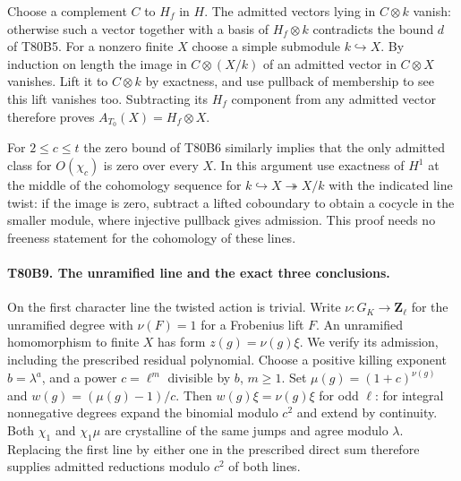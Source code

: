 Choose a complement $C$ to $H_f$ in $H$. The admitted vectors lying in
$C\otimes k$ vanish: otherwise such a vector together with a basis of
$H_f\otimes k$ contradicts the bound $d$ of T80B5. For a nonzero
finite $X$ choose a simple submodule $k\hookrightarrow X$. By induction
on length the image in $C\otimes(X/k)$ of an admitted vector in
$C\otimes X$ vanishes. Lift it to $C\otimes k$ by exactness, and use
pullback of membership to see this lift vanishes too. Subtracting its
$H_f$ component from any admitted vector therefore proves
$A_{T_0}(X)=H_f\otimes X$.

For $2\le c\le t$ the zero bound of T80B6 similarly implies that the
only admitted class for $O(\chi_c)$ is zero over every $X$. In this
argument use exactness of $H^1$ at the middle of the cohomology sequence
for $k\hookrightarrow X\twoheadrightarrow X/k$ with the indicated
line twist: if the image is zero, subtract a lifted coboundary to obtain
a cocycle in the smaller module, where injective pullback gives admission.
This proof needs no freeness statement for the cohomology of these lines.

\paragraph{T80B9. The unramified line and the exact three conclusions.}
On the first character line the twisted action is trivial. Write
$\nu:G_K\to\mathbf Z_\ell$ for the unramified degree with
$\nu(F)=1$ for a Frobenius lift $F$. An unramified homomorphism
to finite $X$ has form $z(g)=\nu(g)\xi$. We verify its admission,
including the prescribed residual polynomial. Choose a positive
killing exponent $b=\lambda^a$, and a power $c=\ell^m$ divisible
by $b$, $m\ge1$. Set $\mu(g)=(1+c)^{\nu(g)}$ and
$w(g)=(\mu(g)-1)/c$. Then $w(g)\xi=\nu(g)\xi$ for odd $\ell$:
for integral nonnegative degrees expand the binomial modulo $c^2$
and extend by continuity. Both $\chi_1$ and $\chi_1\mu$ are
crystalline of the same jumps and agree modulo $\lambda$. Replacing
the first line by either one in the prescribed direct sum therefore
supplies admitted reductions modulo $c^2$ of both lines.

